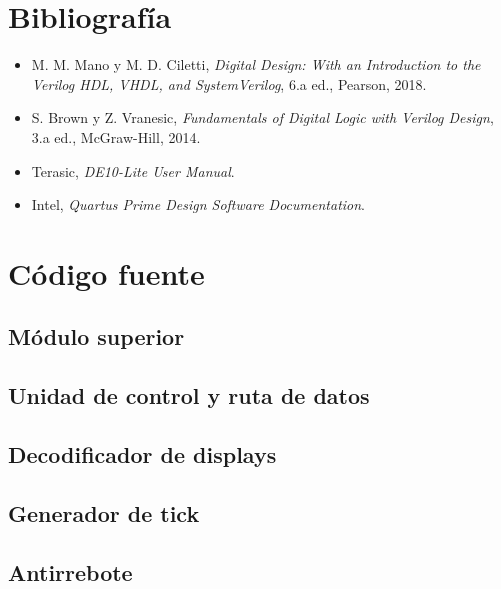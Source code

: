 \documentclass[11pt,a4paper]{article}
\begin{document}
\section{Bibliograf\'ia}
\begin{itemize}
  \item M. M. Mano y M. D. Ciletti, \emph{Digital Design: With an Introduction to the Verilog HDL, VHDL, and SystemVerilog}, 6.a ed., Pearson, 2018.
  \item S. Brown y Z. Vranesic, \emph{Fundamentals of Digital Logic with Verilog Design}, 3.a ed., McGraw-Hill, 2014.
  \item Terasic, \emph{DE10-Lite User Manual}.
  \item Intel, \emph{Quartus Prime Design Software Documentation}.
\end{itemize}

\newpage
\appendix
\section{C\'odigo fuente}
\subsection{M\'odulo superior}

\subsection{Unidad de control y ruta de datos}

\subsection{Decodificador de displays}

\subsection{Generador de tick}

\subsection{Antirrebote}

\end{document}
